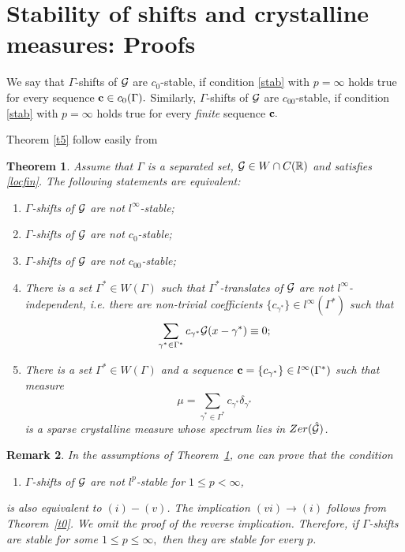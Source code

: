 \documentclass[12pt]{amsart}
\numberwithin{equation}{section}
\newtheorem{theorem}{Theorem}[section]
\newtheorem{remark}[theorem]{Remark}\newtheorem{proposition}[theorem]{Proposition}\newtheorem{definition}[theorem]{Definition}
\newcommand{\R}{{\mathbb R}} \newcommand{\Q}{{\mathbb Q}} \newcommand{\Z}{{\mathbb Z}} \newcommand{\N}{{\mathbb N}}
\begin{document}
\section{Stability of shifts and crystalline measures: Proofs}
We say that 
 $\Gamma$-shifts of $\mathcal{G}$ are  $c_0$-stable, if condition \eqref{stab} with $p= \infty$ holds true for  every sequence ${\bf c}\in c_0(\Gamma).$ Similarly, 
 $\Gamma$-shifts of $\mathcal{G}$ are  $c_{00}$-stable, if condition \eqref{stab} with $p =\infty$ holds true for  every {\it finite} sequence ${\bf c}.$ 

 Theorem \ref{t5} follow easily from
\begin{theorem}\label{schwartz_approx_theorem}
Assume that $\Gamma$ is a separated set, $\Ff\in W\cap C(\R)$ and satisfies \eqref{locfin}.
   The following statements are equivalent:
\begin{enumerate}
    \item[$(i)$] $\Gamma$-shifts of $\mathcal{G}$ are not $l^\infty$-stable{\rm;}
    \item[$(ii)$] $\Gamma$-shifts of $\mathcal{G}$ are not $c_0$-stable{\rm;}
    \item[$(iii)$] $\Gamma$-shifts of $\mathcal{G}$ are not $c_{00}$-stable{\rm;}
    \item[$(iv)$] There is a set $\Gamma^\ast\in W(\Gamma)$ such that $\Gamma^\ast$-translates of $\mathcal{G}$ are not $l^\infty$-independent, i.e. there are non-trivial coefficients $\{c_{\gamma^\ast}\}\in l^\infty(\Gamma^{\ast})$ such that
     \begin{equation}\label{cF_v}
         \sum_{\gamma^\ast\in\Gamma^\ast}c_{\gamma^\ast}\Ff(x-\gamma^\ast)\equiv0;
     \end{equation}
    \item[$(v)$] There is a set $\Gamma^\ast\in W(\Gamma)$ and a sequence ${\bf c}=\{c_{\gamma^\ast}\}\in l^\infty(\Gamma^\ast)$ such that  measure $$\mu=\sum_{\gamma^\ast\in\Gamma^\ast}c_{\gamma^\ast}\delta_{\gamma^\ast}$$ is a sparse crystalline measure whose spectrum lies in ${\rm Zer}(\hat\Ff)$.
\end{enumerate}
\end{theorem}


\begin{remark}
    In the assumptions of Theorem~\ref{schwartz_approx_theorem}, one can prove that the condition
\begin{enumerate}
    \item[$(vi)$] $\Gamma$-shifts of $\mathcal{G}$ are not $l^{p}$-stable for $1\le p < \infty$,
\end{enumerate}
    is also equivalent to $(i)-(v)$. The  implication $(vi) \rightarrow (i)$ follows from  Theorem~\ref{t0}.
    We omit the proof of the reverse implication.   
   Therefore,  if  $\Gamma$-shifts are stable for some  $1\leq p\leq\infty,$ then they are stable for every $p$.
\end{remark}
\end{document}
